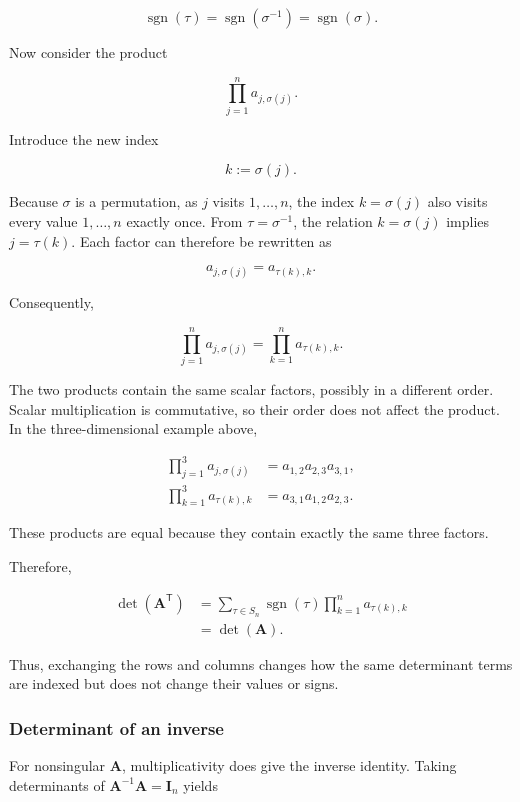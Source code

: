 \documentclass[
  australian,
  12pt,
  letterpaper,
  DIV=11,
  numbers=noendperiod,
  twoside]{scrreprt}
\begin{document}
\[
\operatorname{sgn}(\tau)
=
\operatorname{sgn}(\sigma^{-1})
=
\operatorname{sgn}(\sigma).
\]

Now consider the product

\[
\prod_{j=1}^{n}a_{j,\sigma(j)}.
\]

Introduce the new index

\[
k\mathrel{:=}\sigma(j).
\]

Because \(\sigma\) is a permutation, as \(j\) visits \(1,\ldots,n\), the
index \(k=\sigma(j)\) also visits every value \(1,\ldots,n\) exactly
once. From \(\tau=\sigma^{-1}\), the relation \(k=\sigma(j)\) implies
\(j=\tau(k)\). Each factor can therefore be rewritten as

\[
a_{j,\sigma(j)}=a_{\tau(k),k}.
\]

Consequently,

\[
\prod_{j=1}^{n}a_{j,\sigma(j)}
=
\prod_{k=1}^{n}a_{\tau(k),k}.
\]

The two products contain the same scalar factors, possibly in a
different order. Scalar multiplication is commutative, so their order
does not affect the product. In the three-dimensional example above,

\[
\begin{aligned}
\prod_{j=1}^{3}a_{j,\sigma(j)}
&=a_{1,2}a_{2,3}a_{3,1},\\
\prod_{k=1}^{3}a_{\tau(k),k}
&=a_{3,1}a_{1,2}a_{2,3}.
\end{aligned}
\]

These products are equal because they contain exactly the same three
factors.

Therefore,

\[
\begin{aligned}
\det(\mathbf A^{\mathsf T})
&=\sum_{\tau\in S_n}\operatorname{sgn}(\tau)
\prod_{k=1}^{n}a_{\tau(k),k}\\
&=\det(\mathbf A).
\end{aligned}
\]

Thus, exchanging the rows and columns changes how the same determinant
terms are indexed but does not change their values or signs.

\subsubsection{Determinant of an
inverse}\label{determinant-of-an-inverse}

For nonsingular \(\mathbf A\), multiplicativity does give the inverse
identity. Taking determinants of \(\mathbf A^{-1}\mathbf A=\mathbf I_n\)
yields
\end{document}
